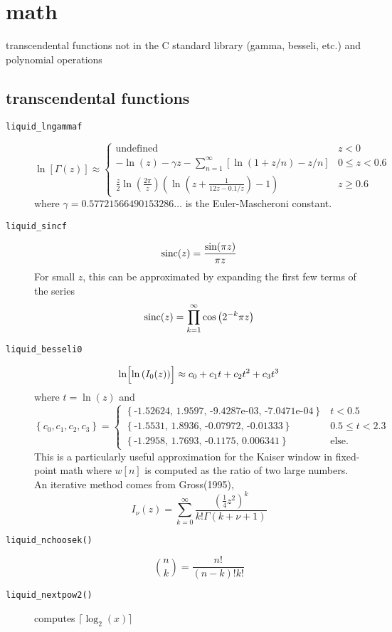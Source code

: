 % 
%

\section{math}
\label{module:math}
transcendental functions not in the C standard library (gamma, besseli, etc.)
and polynomial operations

\subsection{transcendental functions}
\label{module:math:transcendentals}

\begin{description}
\item[{\tt liquid\_lngammaf}]
\[
    \ln\left[ \Gamma(z) \right] \approx
    \begin{cases}
        \text{undefined}
        & z < 0 \\
        -\ln(z) - \gamma z - \sum_{n=1}^{\infty} {
            \left[ \ln(1 + z/n) -z/n\right]
        }
        & 0 \le z < 0.6 \\
        \frac{z}{2} \ln\left( \frac{2\pi}{z} \right)
        \left(
            \ln\left(z + \frac{1}{12 z - 0.1/z} \right) - 1
        \right)
        & z \ge 0.6
    \end{cases}
\]
where $\gamma=0.57721566490153286\ldots$ is the Euler-Mascheroni constant.

\item[{\tt liquid\_sincf}]
\[ \textup{sinc}(z) = \frac{\sin(\pi z)}{\pi z} \]
For small $z$, this can be approximated by expanding the first few terms of
the series
\[
    \textup{sinc}(z) = \prod_{k=1}^{\infty}{ \cos\left( 2^{-k} \pi z \right) }
\]

\item[{\tt liquid\_besseli0}]
\[
    \ln\Bigl[\ln\left(I_0(z)\right)\Bigr] \approx
    c_0 + c_1 t + c_2 t ^2 + c_3 t^3
\]
where $t=\ln(z)$ and
\[
    \left\{c_0,c_1,c_2,c_3\right\} =
    \begin{cases}
    \left\{\text{-1.52624, 1.9597, -9.4287e-03, -7.0471e-04}\right\} & t < 0.5 \\
    \left\{\text{-1.5531, 1.8936, -0.07972, -0.01333}\right\} & 0.5 \le t < 2.3 \\
    \left\{\text{-1.2958, 1.7693, -0.1175, 0.006341}\right\} & \text{else}.
    \end{cases}
\]
This is a particularly useful approximation for the Kaiser window in
fixed-point math where $w[n]$ is computed as the ratio of two large numbers.
%
An iterative method comes from Gross(1995),
\[
    I_\nu(z) = \sum_{k=0}^{\infty}{\frac{\left(\frac{1}{4}z^2\right)^k}{k!\Gamma(k+\nu+1)}}
\]

\item[{\tt liquid\_nchoosek()}]
\[
    {n \choose k} = \frac{n!}{(n-k)!k!}
\]

\item[{\tt liquid\_nextpow2()}]
    computes $\lceil \log_2(x) \rceil$

\end{description}

